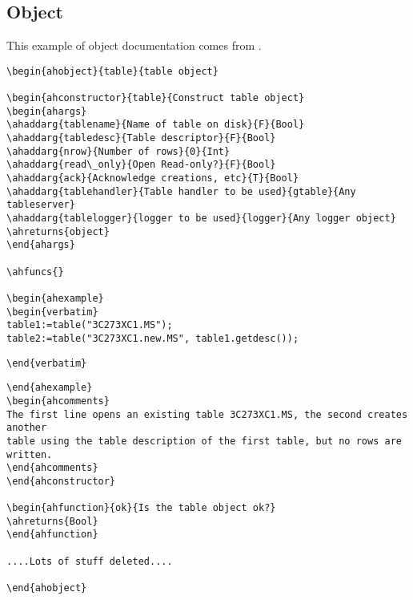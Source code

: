 \subsection{Object}

\label{197:example_object}
This example of object documentation comes from
.
\begin{verbatim}
\begin{ahobject}{table}{table object}

\begin{ahconstructor}{table}{Construct table object}
\begin{ahargs}
\ahaddarg{tablename}{Name of table on disk}{F}{Bool}
\ahaddarg{tabledesc}{Table descriptor}{F}{Bool}
\ahaddarg{nrow}{Number of rows}{0}{Int}
\ahaddarg{read\_only}{Open Read-only?}{F}{Bool}
\ahaddarg{ack}{Acknowledge creations, etc}{T}{Bool}
\ahaddarg{tablehandler}{Table handler to be used}{gtable}{Any tableserver}
\ahaddarg{tablelogger}{logger to be used}{logger}{Any logger object}
\ahreturns{object}
\end{ahargs}

\ahfuncs{}

\begin{ahexample}
\begin{verbatim}
table1:=table("3C273XC1.MS");
table2:=table("3C273XC1.new.MS", table1.getdesc());
\end{verbatim}
\verb!\end{verbatim}!
\begin{verbatim}
\end{ahexample}
\begin{ahcomments}
The first line opens an existing table 3C273XC1.MS, the second creates another
table using the table description of the first table, but no rows are written.
\end{ahcomments}
\end{ahconstructor}

\begin{ahfunction}{ok}{Is the table object ok?}
\ahreturns{Bool}
\end{ahfunction}

....Lots of stuff deleted....

\end{ahobject}
\end{verbatim}

